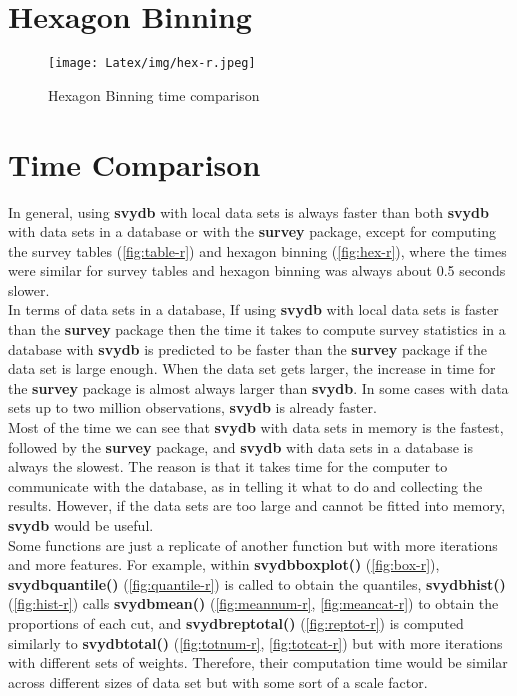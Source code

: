 \section{Hexagon Binning}
\begin{figure}[H]
   \centering
    \texttt{[image: Latex/img/hex-r.jpeg]}
    \caption{Hexagon Binning time comparison}
    \label{fig:hex-r}
\end{figure}

\newpage

\section{Time Comparison}

In general, using {\bf svydb} with local data sets is always faster than both {\bf svydb} with data sets in a database or with the {\bf survey} package, except for computing the survey tables (\autoref{fig:table-r}) and hexagon binning (\autoref{fig:hex-r}), where the times were similar for survey tables and hexagon binning was always about 0.5 seconds slower.\\

In terms of data sets in a database, If using {\bf svydb} with local data sets is faster than the {\bf survey} package then the time it takes to compute survey statistics in a database with {\bf svydb} is predicted to be faster than the {\bf survey} package if the data set is large enough. When the data set gets larger, the increase in time for the {\bf survey} package is almost always larger than {\bf svydb}. In some cases with data sets up to two million observations, {\bf svydb} is already faster. \\

Most of the time we can see that {\bf svydb} with data sets in memory is the fastest, followed by the {\bf survey} package, and {\bf svydb} with data sets in a database is always the slowest. The reason is that it takes time for the computer to communicate with the database, as in telling it what to do and collecting the results. However, if the data sets are too large and cannot be fitted into memory, {\bf svydb} would be useful.\\

Some functions are just a replicate of another function but with more iterations and more features. For example, within {\bf svydbboxplot()} (\autoref{fig:box-r}), {\bf svydbquantile()} (\autoref{fig:quantile-r}) is called to obtain the quantiles, {\bf svydbhist()} (\autoref{fig:hist-r}) calls {\bf svydbmean()} (\autoref{fig:meannum-r}, \autoref{fig:meancat-r}) to obtain the proportions of each cut, and {\bf svydbreptotal()} (\autoref{fig:reptot-r}) is computed similarly to {\bf svydbtotal()} (\autoref{fig:totnum-r}, \autoref{fig:totcat-r}) but with more iterations with different sets of weights. Therefore, their computation time would be similar across different sizes of data set but with some sort of a scale factor.\\

